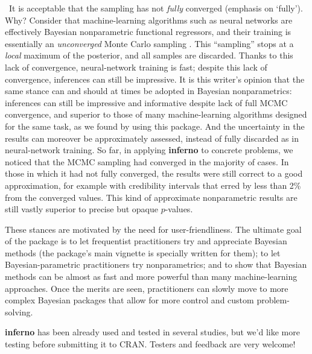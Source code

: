 \textbullet\ It is acceptable that the sampling has not \emph{fully} converged (emphasis on `fully'). Why? Consider that machine-learning algorithms such as neural networks are effectively Bayesian nonparametric functional regressors, and their training is essentially an \emph{unconverged} Monte Carlo sampling \citep[see e.g.][]{mackay1992b,gal2016,mandtetal2017,huszar2017}. This ``sampling'' stops at a \emph{local} maximum of the posterior, and all samples are discarded. Thanks to this lack of convergence, neural-network training is fast; despite this lack of convergence, inferences can still be impressive. It is this writer's opinion that the same stance can and should at times be adopted in Bayesian nonparametrics: inferences can still be impressive and informative despite lack of full MCMC convergence, and superior to those of many machine-learning algorithms designed for the same task, as we found by using this package. And the uncertainty in the results can moreover be approximately assessed, instead of fully discarded as in neural-network training. So far, in applying \textbf{inferno} to concrete problems, we noticed that the MCMC sampling had converged in the majority of cases. In those in which it had not fully converged, the results were still correct to a good approximation, for example with credibility intervals that erred by less than 2\% from the converged values. This kind of approximate nonparametric results are still vastly superior to precise but opaque $p$-values.

These stances are motivated by the need for user-friendliness. The ultimate goal of the package is to let frequentist practitioners try and appreciate Bayesian methods (the package's main vignette is specially written for them); to let Bayesian-parametric practitioners try nonparametrics; and to show that Bayesian methods can be almost as fast and more powerful than many machine-learning approaches. Once the merits are seen, practitioners can slowly move to more complex Bayesian packages that allow for more control and custom problem-solving.

\textbf{inferno} has been already used and tested in several studies, but we'd like more testing before submitting it to CRAN. Testers and feedback are very welcome!




{\small

}


